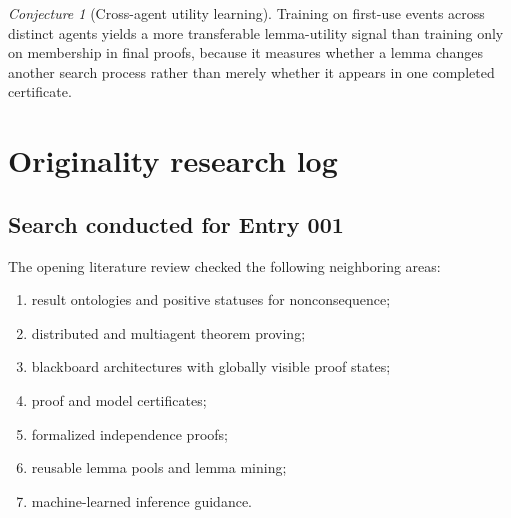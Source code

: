 \documentclass[11pt]{article}
\theoremstyle{definition}
\theoremstyle{remark}
\newtheorem{conjecture}[theorem]{Conjecture}
\begin{document}
\begin{conjecture}[Cross-agent utility learning]
Training on first-use events across distinct agents yields a more transferable lemma-utility signal than training only on membership in final proofs, because it measures whether a lemma changes another search process rather than merely whether it appears in one completed certificate.
\end{conjecture}

\section{Originality research log}

\subsection{Search conducted for Entry 001}
The opening literature review checked the following neighboring areas:
\begin{enumerate}
  \item result ontologies and positive statuses for nonconsequence;
  \item distributed and multiagent theorem proving;
  \item blackboard architectures with globally visible proof states;
  \item proof and model certificates;
  \item formalized independence proofs;
  \item reusable lemma pools and lemma mining;
  \item machine-learned inference guidance.
\end{enumerate}
\end{document}
